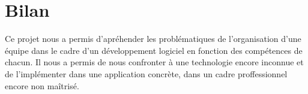 \section{Bilan}

Ce projet nous a permis d'apréhender les problématiques de l'organisation d'une équipe dans le cadre d'un développement logiciel en fonction des compétences de chacun.
Il nous a permis de nous confronter à une technologie encore inconnue et de l'implémenter dans une application concrète, dans un cadre proffessionnel encore non maîtrisé.

